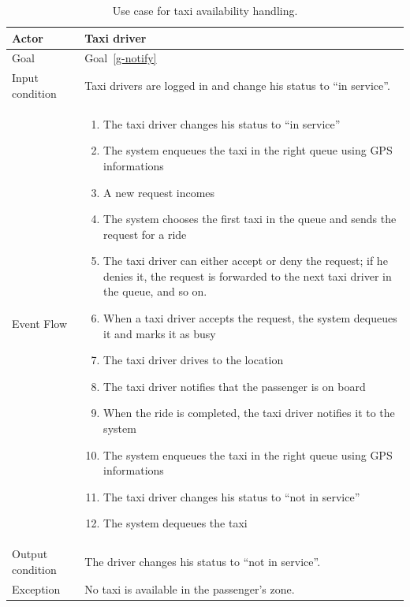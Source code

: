 \begin{table}
\begin{center}
\begin{tabular}{| l | p{} |}
\hline
Actor & Taxi driver \\
\hline
Goal & Goal~\ref{g-notify}
\\
\hline
Input condition & Taxi drivers are logged in and change his status to ``in service''.  \\
\hline
Event Flow & \begin{enumerate}
	\item The taxi driver changes his status to ``in service''
	\item The system enqueues the taxi in the right queue using GPS informations
	\item A new request incomes
	\item The system chooses the first taxi in the queue and sends the request for a ride
	\item The taxi driver can either accept or deny the request; if he denies it, the request is forwarded to the next taxi driver in the queue, and so on.
	\item When a taxi driver accepts the request, the system dequeues it and marks it as busy
	\item The taxi driver drives to the location
	\item The taxi driver notifies that the passenger is on board
	\item When the ride is completed, the taxi driver notifies it to the system
	\item The system enqueues the taxi in the right queue using GPS informations
	\item The taxi driver changes his status to ``not in service''
	\item The system dequeues the taxi
\end{enumerate}
\\
\hline
Output condition & The driver changes his status to ``not in service''. \\
\hline
Exception & No taxi is available in the passenger's zone. \\
\hline
\end{tabular}
\end{center}
\caption{Use case for taxi availability handling.}
\label{usecase-taxiavailability}
\end{table}

